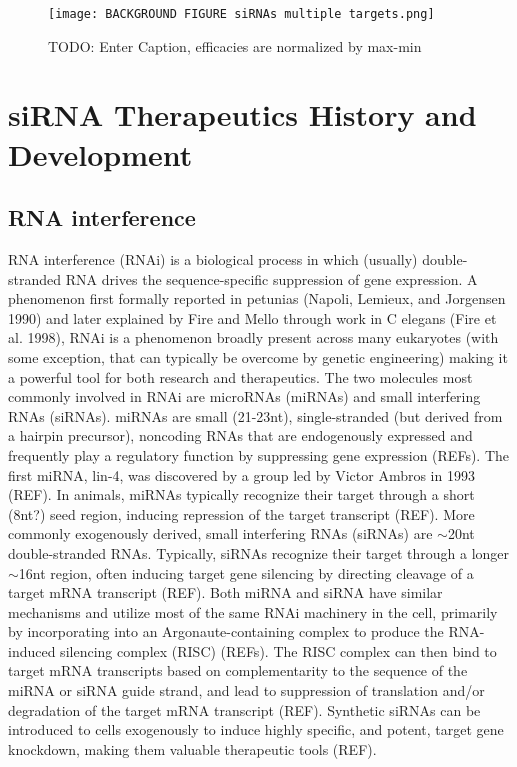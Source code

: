 \documentclass{report}
\begin{document}
\begin{figure}
    \centering
    \texttt{[image: BACKGROUND FIGURE siRNAs multiple targets.png]}
    \caption{TODO: Enter Caption, efficacies are normalized by max-min}
    \label{fig:Figure+ siRNAs ranging efficacies multiple target genes}
\end{figure}

\section{siRNA Therapeutics History and Development} %
\subsection{RNA interference}

RNA interference (RNAi) is a biological process in which (usually) double-stranded RNA drives the sequence-specific suppression of gene expression. A phenomenon first formally reported in petunias (Napoli, Lemieux, and Jorgensen 1990) and later explained by Fire and Mello through work in C elegans (Fire et al. 1998), RNAi is a phenomenon broadly present across many eukaryotes (with some exception, that can typically be overcome by genetic engineering) making it a powerful tool for both research and therapeutics. The two molecules most commonly involved in RNAi are microRNAs (miRNAs) and small interfering RNAs (siRNAs). miRNAs are small (21-23nt), single-stranded (but derived from a hairpin precursor), noncoding RNAs that are endogenously expressed and frequently play a regulatory function by suppressing gene expression (REFs). The first miRNA, lin-4, was discovered by a group led by Victor Ambros in 1993 (REF). In animals, miRNAs typically recognize their target through a short (8nt?) seed region, inducing repression of the target transcript (REF). More commonly exogenously derived, small interfering RNAs (siRNAs) are $\sim$20nt double-stranded RNAs. Typically, siRNAs recognize their target through a longer $\sim$16nt region, often inducing target gene silencing by directing cleavage of a target mRNA transcript (REF). Both miRNA and siRNA have similar mechanisms and utilize most of the same RNAi machinery in the cell, primarily by incorporating into an Argonaute-containing complex to produce the RNA-induced silencing complex (RISC) (REFs). The RISC complex can then bind to target mRNA transcripts based on complementarity to the sequence of the miRNA or siRNA guide strand, and lead to suppression of translation and/or degradation of the target mRNA transcript (REF). Synthetic siRNAs can be introduced to cells exogenously to induce highly specific, and potent, target gene knockdown, making them valuable therapeutic tools (REF).
\end{document}
